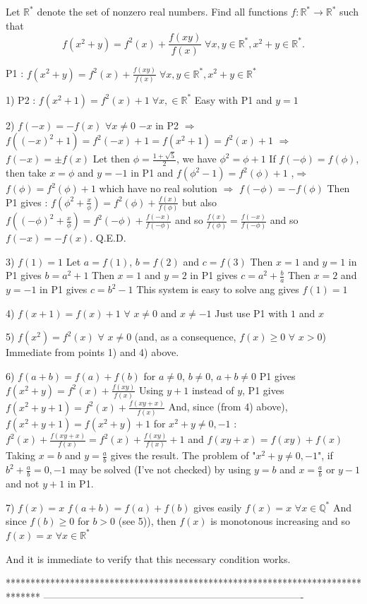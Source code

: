 \begin{mysolution}
	\begin{tcolorbox}Let $\mathbb{R}^{*}$ denote the set of nonzero real numbers. Find all functions $f: \mathbb{R}^{*}\to\mathbb{R}^{*}$ such that
\[f(x^{2}+y)=f^{2}(x)+\frac{f(xy)}{f(x)}\; \forall x,y\in\mathbb{R}^{*},x^{2}+y\in\mathbb{R}^{*}. \]
\end{tcolorbox}

P1 : $f(x^{2}+y)=f^{2}(x)+\frac{f(xy)}{f(x)}\; \forall x,y\in\mathbb{R}^{*},x^{2}+y\in\mathbb{R}^{*}$

1) P2 : $f(x^{2}+1)=f^{2}(x)+1\; \forall x,\in\mathbb{R}^{*}$
Easy with P1 and $y=1$

2) $f(-x)=-f(x)$ $\forall x\neq 0$
$-x$ in P2 $\Rightarrow$ $f((-x)^{2}+1)=f^{2}(-x)+1=f(x^{2}+1)=f^{2}(x)+1$ $\Rightarrow$ $f(-x)=\pm f(x)$
Let then $\phi=\frac{1+\sqrt{5}}{2}$, we have $\phi^{2}=\phi+1$
If $f(-\phi)=f(\phi)$, then take $x=\phi$ and $y=-1$ in P1 and $f(\phi^{2}-1)=f^{2}(\phi)+1$ ,$\Rightarrow$ $f(\phi)=f^{2}(\phi)+1$ which have no real solution $\Rightarrow$ $f(-\phi)=-f(\phi)$ 
Then P1 gives : $f(\phi^{2}+\frac{x}{\phi})=f^{2}(\phi)+\frac{f(x)}{f(\phi)}$ but also $f((-\phi)^{2}+\frac{x}{\phi})=f^{2}(-\phi)+\frac{f(-x)}{f(-\phi)}$ and so $\frac{f(x)}{f(\phi)}=\frac{f(-x)}{f(-\phi)}$ and so $f(-x)=-f(x)$. Q.E.D.

3) $f(1)=1$
Let $a=f(1)$, $b=f(2)$ and $c=f(3)$
Then $x=1$ and $y=1$ in P1 gives $b=a^{2}+1$
Then $x=1$ and $y=2$ in P1 gives $c=a^{2}+\frac{b}{a}$
Then $x=2$ and $y=-1$ in P1 gives $c=b^{2}-1$
This system is easy to solve ang gives $f(1)=1$

4) $f(x+1)=f(x)+1$ $\forall$ $x\neq 0$ and $x\neq-1$
Just use P1 with $1$ and $x$

5) $f(x^{2})=f^{2}(x)$ $\forall$ $x\neq 0$ (and, as a consequence, $f(x)\geq 0$ $\forall$ $x>0$)
Immediate from points 1) and 4) above.

6) $f(a+b)=f(a)+f(b)$ for $a\neq 0$, $b\neq 0$, $a+b\neq 0$
P1 gives $f(x^{2}+y)=f^{2}(x)+\frac{f(xy)}{f(x)}$
Using $y+1$ instead of $y$, P1 gives $f(x^{2}+y+1)=f^{2}(x)+\frac{f(xy+x)}{f(x)}$
And, since (from 4) above), $f(x^{2}+y+1)=f(x^{2}+y)+1$ for $x^{2}+y\neq 0,-1$ :
$f^{2}(x)+\frac{f(xy+x)}{f(x)}=f^{2}(x)+\frac{f(xy)}{f(x)}+1$ and $f(xy+x)=f(xy)+f(x)$
Taking $x=b$ and $y=\frac{a}{b}$ gives the result.
The problem of "$x^{2}+y\neq 0,-1$", if  $b^{2}+\frac{a}{b}=0,-1$ may be solved (I've not checked) by using $y=b$ and $x=\frac{a}{b}$ or $y-1$ and not $y+1$ in P1.

7) $f(x)=x$
$f(a+b)=f(a)+f(b)$  gives easily $f(x)=x$ $\forall x\in\mathbb{Q}^{*}$
And since $f(b)\geq 0$ for $b>0$ (see 5)), then $f(x)$ is monotonous increasing and so $f(x)=x$ $\forall x\in\mathbb{R}^{*}$

And it is immediate to verify that this necessary condition works.
\end{mysolution}
*******************************************************************************
-------------------------------------------------------------------------------

